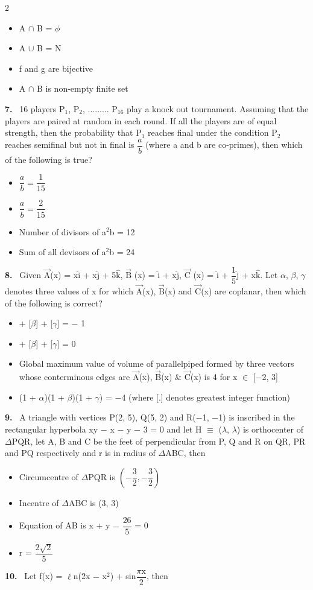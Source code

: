 \documentclass[10pt]{extarticle}
\newcommand{\qn}[1]{\par\smallskip\noindent\textbf{#1.}~}
\newenvironment{qoptions}{\begin{itemize}[leftmargin=1.8em,itemsep=1pt,topsep=2pt,label={}]}{\end{itemize}}
\newcommand{\opt}[2]{\item[(#1)] #2}
\begin{document}
\begin{multicols}{2}
\begin{qoptions}
\opt{A}{A $\cap$ B = $\phi$}
\opt{B}{A $\cup$ B = N}
\opt{C}{f and g are bijective}
\opt{D}{A $\cap$ B is non-empty finite set}
\end{qoptions}
\qn{7} 16 players P$_1$, P$_2$, ......... P$_{16}$ play a knock out tournament. Assuming that the players are paired at random in each round. If all the players are of equal strength, then the probability that P$_1$ reaches final under the condition P$_2$ reaches semifinal but not in final is $\dfrac ab$ (where a and b are co-primes), then which of the following is true?
\begin{qoptions}
\opt{A}{$\dfrac ab=\dfrac1{15}$}
\opt{B}{$\dfrac ab=\dfrac2{15}$}
\opt{C}{Number of divisors of a$^2$b = 12}
\opt{D}{Sum of all devisors of a$^2$b = 24}
\end{qoptions}
\qn{8} Given $\overrightarrow{\mathrm A}$(x) = x$\hat{\mathrm i}$ + x$\hat{\mathrm j}$ + 5$\hat{\mathrm k}$, $\overrightarrow{\mathrm B}$ (x) = $\hat{\mathrm i}$ + x$\hat{\mathrm j}$, $\overrightarrow{\mathrm C}$ (x) = $\hat{\mathrm i}$ + $\dfrac15\hat{\mathrm j}$ + x$\hat{\mathrm k}$. Let $\alpha$, $\beta$, $\gamma$ denotes three values of x for which $\overrightarrow{\mathrm A}$(x), $\overrightarrow{\mathrm B}$(x) and $\overrightarrow{\mathrm C}$(x) are coplanar, then which of the following is correct?
\begin{qoptions}
\opt{A}{[$\alpha$] + [$\beta$] + [$\gamma$] = $-$ 1}
\opt{B}{[$\alpha$] + [$\beta$] + [$\gamma$] = 0}
\opt{C}{Global maximum value of volume of parallelpiped formed by three vectors whose conterminous edges are $\overrightarrow{\mathrm A}$(x), $\overrightarrow{\mathrm B}$(x) \& $\overrightarrow{\mathrm C}$(x) is 4 for x $\in$ [$-$2, 3]}
\opt{D}{(1 + $\alpha$)(1 + $\beta$)(1 + $\gamma$) = $-$4 (where [.] denotes greatest integer function)}
\end{qoptions}
\qn{9} A triangle with vertices P(2, 5), Q(5, 2) and R($-$1, $-$1) is inscribed in the rectangular hyperbola xy $-$ x $-$ y $-$ 3 = 0 and let H $\equiv$ ($\lambda$, $\lambda$) is orthocenter of $\Delta$PQR, let A, B and C be the feet of perpendicular from P, Q and R on QR, PR and PQ respectively and r is in radius of $\Delta$ABC, then
\begin{qoptions}
\opt{A}{Circumcentre of $\Delta$PQR is $\left(-\dfrac32,-\dfrac32\right)$}
\opt{B}{Incentre of $\Delta$ABC is (3, 3)}
\opt{C}{Equation of AB is x + y $-$ $\dfrac{26}5$ = 0}
\opt{D}{r = $\dfrac{2\sqrt2}5$}
\end{qoptions}
\qn{10} Let f(x) = $\ell$n(2x $-$ x$^2$) + sin$\dfrac{\pi\mathrm x}2$, then

\end{multicols}
\end{document}

